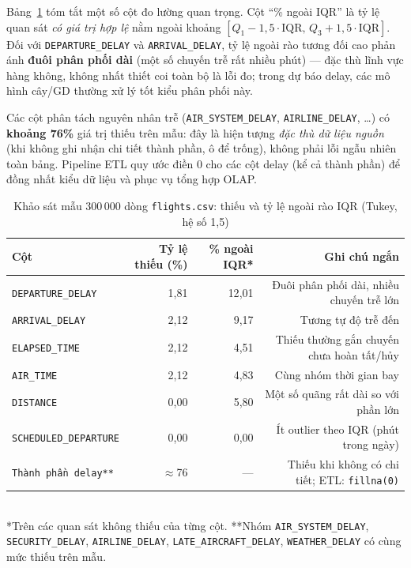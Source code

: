 Bảng~\ref{tab:eda_outliers_summary} tóm tắt một số cột đo lường quan trọng.
Cột ``\% ngoài IQR'' là tỷ lệ quan sát \emph{có giá trị hợp lệ} nằm ngoài khoảng
$[Q_1 - 1{,}5\cdot\mathrm{IQR},\, Q_3 + 1{,}5\cdot\mathrm{IQR}]$.
Đối với \texttt{DEPARTURE\_DELAY} và \texttt{ARRIVAL\_DELAY}, tỷ lệ ngoài rào tương đối cao
phản ánh \textbf{đuôi phân phối dài} (một số chuyến trễ rất nhiều phút) --- đặc thù lĩnh vực hàng không,
không nhất thiết coi toàn bộ là lỗi đo; trong dự báo delay, các mô hình cây/GD thường xử lý tốt kiểu phân phối này.

Các cột phân tách nguyên nhân trễ (\texttt{AIR\_SYSTEM\_DELAY}, \texttt{AIRLINE\_DELAY}, \ldots)
có \textbf{khoảng 76\%} giá trị thiếu trên mẫu: đây là hiện tượng \emph{đặc thù dữ liệu nguồn}
(khi không ghi nhận chi tiết thành phần, ô để trống), không phải lỗi ngẫu nhiên toàn bảng.
Pipeline ETL quy ước điền 0 cho các cột delay (kể cả thành phần) để đồng nhất kiểu dữ liệu và phục vụ tổng hợp OLAP.

\begin{table}[H]
\centering
\caption{Khảo sát mẫu 300\,000 dòng \texttt{flights.csv}: thiếu và tỷ lệ ngoài rào IQR (Tukey, hệ số 1{,}5)}
\vspace{4pt}
\small
\setlength{\tabcolsep}{5pt}
\begin{tabular}{|l|r|r|r|}
\hline
\textbf{Cột} & \textbf{Tỷ lệ thiếu (\%)} & \textbf{\% ngoài IQR*} & \textbf{Ghi chú ngắn} \\ \hline
\texttt{DEPARTURE\_DELAY}   & 1{,}81  & 12{,}01 & Đuôi phân phối dài, nhiều chuyến trễ lớn \\ \hline
\texttt{ARRIVAL\_DELAY}     & 2{,}12  & 9{,}17  & Tương tự độ trễ đến \\ \hline
\texttt{ELAPSED\_TIME}      & 2{,}12  & 4{,}51  & Thiếu thường gắn chuyến chưa hoàn tất/hủy \\ \hline
\texttt{AIR\_TIME}          & 2{,}12  & 4{,}83  & Cùng nhóm thời gian bay \\ \hline
\texttt{DISTANCE}           & 0{,}00  & 5{,}80  & Một số quãng rất dài so với phần lớn \\ \hline
\texttt{SCHEDULED\_DEPARTURE} & 0{,}00 & 0{,}00  & Ít outlier theo IQR (phút trong ngày) \\ \hline
\texttt{Thành phần delay**} & $\approx$76 & --- & Thiếu khi không có chi tiết; ETL: \texttt{fillna(0)} \\ \hline
\end{tabular}
\\[4pt]
\footnotesize
*Trên các quan sát không thiếu của từng cột. **Nhóm \texttt{AIR\_SYSTEM\_DELAY}, \texttt{SECURITY\_DELAY},
\texttt{AIRLINE\_DELAY}, \texttt{LATE\_AIRCRAFT\_DELAY}, \texttt{WEATHER\_DELAY} có cùng mức thiếu trên mẫu.
\label{tab:eda_outliers_summary}
\end{table}

